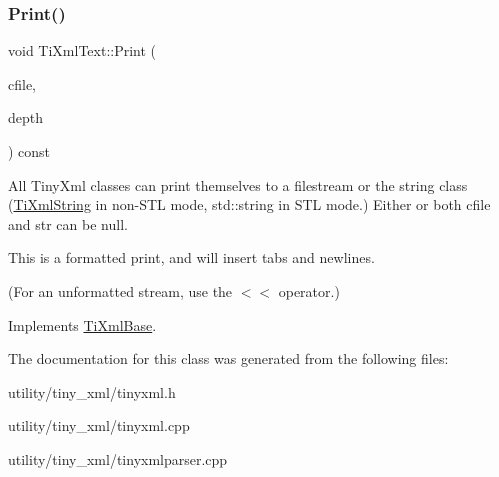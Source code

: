 \mbox{\label{class_ti_xml_text_a75f6895906333894e2574cc8cf77ea79}} 
\subsubsection{\texorpdfstring{Print()}{Print()}}
{\footnotesize\ttfamily void Ti\+Xml\+Text\+::\+Print (\begin{DoxyParamCaption}\item[{F\+I\+LE $\ast$}]{cfile,  }\item[{int}]{depth }\end{DoxyParamCaption}) const\hspace{0.3cm}{\ttfamily [virtual]}}

All Tiny\+Xml classes can print themselves to a filestream or the string class (\hyperlink{class_ti_xml_string}{Ti\+Xml\+String} in non-\/\+S\+TL mode, std\+::string in S\+TL mode.) Either or both cfile and str can be null.

This is a formatted print, and will insert tabs and newlines.

(For an unformatted stream, use the $<$$<$ operator.) 

Implements \hyperlink{class_ti_xml_base_a0de56b3f2ef14c65091a3b916437b512}{Ti\+Xml\+Base}.



The documentation for this class was generated from the following files\+:\begin{DoxyCompactItemize}
\item 
utility/tiny\+\_\+xml/tinyxml.\+h\item 
utility/tiny\+\_\+xml/tinyxml.\+cpp\item 
utility/tiny\+\_\+xml/tinyxmlparser.\+cpp\end{DoxyCompactItemize}
